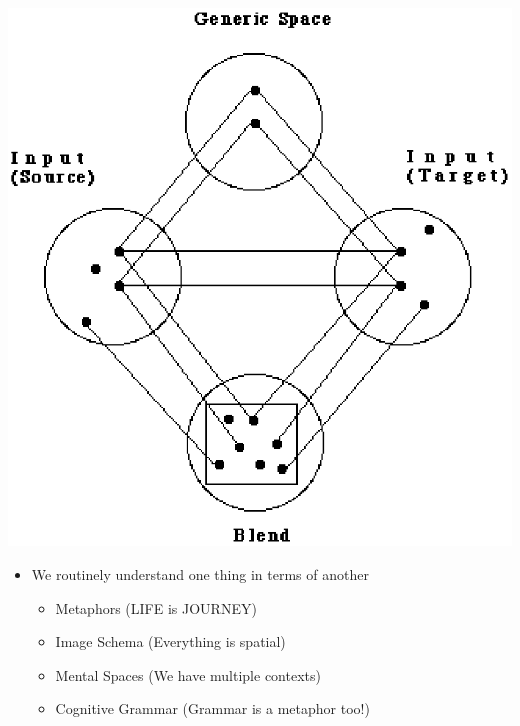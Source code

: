 \documentclass[headrule,footrule]{foils}
\begin{document}
\includegraphics[height=\textheight]{pics/blending.eps}



\begin{itemize}
\item We routinely understand one thing in terms of another
  \begin{itemize}
  \item Metaphors (LIFE is  JOURNEY)
  \item Image Schema (Everything is spatial)
  \item Mental Spaces (We have multiple contexts)
  \item Cognitive Grammar (Grammar is a metaphor too!)
  \end{itemize}
\end{itemize}
\end{document}
